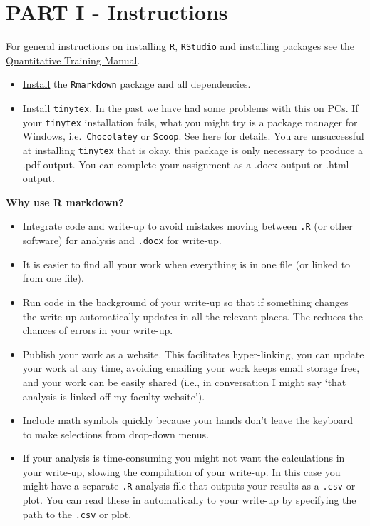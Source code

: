 \documentclass[
]{book}
\providecommand{\tightlist}{%
  \setlength{\itemsep}{0pt}\setlength{\parskip}{0pt}}
\begin{document}
\hypertarget{partI}{%
\chapter*{PART I - Instructions}\label{partI}}

For general instructions on installing \texttt{R}, \texttt{RStudio} and installing packages see the \href{https://ahurford.github.io/quant-guide-all-courses/}{Quantitative Training Manual}.

\begin{itemize}
\tightlist
\item
  \href{https://ahurford.github.io/quant-guide-all-courses/install.html}{Install} the \texttt{Rmarkdown} package and all dependencies.
\item
  Install \texttt{tinytex}. In the past we have had some problems with this on PCs. If your \texttt{tinytex} installation fails, what you might try is a package manager for Windows, i.e.~\texttt{Chocolatey} or \texttt{Scoop}. See \href{https://github.com/rstudio/tinytex-releases}{here} for details. You are unsuccessful at installing \texttt{tinytex} that is okay, this package is only necessary to produce a .pdf output. You can complete your assignment as a .docx output or .html output.
\end{itemize}

\textbf{Why use R markdown?}

\begin{itemize}
\item
  Integrate code and write-up to avoid mistakes moving between \texttt{.R} (or other software) for analysis and \texttt{.docx} for write-up.
\item
  It is easier to find all your work when everything is in one file (or linked to from one file).
\item
  Run code in the background of your write-up so that if something changes the write-up automatically updates in all the relevant places. The reduces the chances of errors in your write-up.
\item
  Publish your work as a website. This facilitates hyper-linking, you can update your work at any time, avoiding emailing your work keeps email storage free, and your work can be easily shared (i.e., in conversation I might say `that analysis is linked off my faculty website').
\item
  Include math symbols quickly because your hands don't leave the keyboard to make selections from drop-down menus.
\item
  If your analysis is time-consuming you might not want the calculations in your write-up, slowing the compilation of your write-up. In this case you might have a separate \texttt{.R} analysis file that outputs your results as a \texttt{.csv} or plot. You can read these in automatically to your write-up by specifying the path to the \texttt{.csv} or plot.
\end{itemize}
\end{document}
